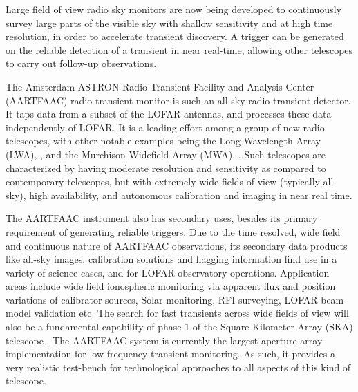 \documentclass{ws-jai}
\begin{document}
Large field of  view radio sky monitors are now  being developed to continuously
survey large parts of the visible sky  with shallow sensitivity and at high time
resolution,  in order  to  accelerate  transient discovery.   A  trigger can  be
generated on the  reliable detection of a transient in  near real-time, allowing
other telescopes to carry out follow-up observations.


The  Amsterdam-ASTRON Radio  Transient Facility  and Analysis  Center (AARTFAAC)
radio transient  monitor is such  an all-sky  radio transient detector.  It taps
data from a subset of the LOFAR antennas, and processes these data independently
of LOFAR.  It  is a leading effort  among a group of new  radio telescopes, with
other   notable    examples   being    the   Long   Wavelength    Array   (LWA),
\cite{ellingsonLWA1},   and  the   Murchison   Widefield   Array  (MWA),   \cite
     {tingay2013murchison}.   Such   telescopes  are  characterized   by  having
     moderate resolution and sensitivity as compared to contemporary telescopes,
     but  with  extremely  wide  fields   of  view  (typically  all  sky),  high
     availability, and autonomous calibration and imaging in near real time.

The AARTFAAC instrument also has secondary uses, besides its primary requirement
of  generating reliable  triggers.  Due  to the  time resolved,  wide field  and
continuous nature  of AARTFAAC  observations, its  secondary data  products like
all-sky images,  calibration solutions  and flagging information  find use  in a
variety of  science cases,  and for  LOFAR observatory  operations.  Application
areas include wide  field ionospheric monitoring via apparent  flux and position
variations of  calibrator sources, Solar  monitoring, RFI surveying,  LOFAR beam
model validation etc. The search for  fast transients across wide fields of view
will also be a  fundamental capability of phase 1 of  the Square Kilometer Array
(SKA) telescope \cite{colegate2011searching}.  The  AARTFAAC system is currently
the  largest   aperture  array   implementation  for  low   frequency  transient
monitoring. As such,  it provides a very realistic  test-bench for technological
approaches to all aspects of this kind of telescope.
\end{document}
